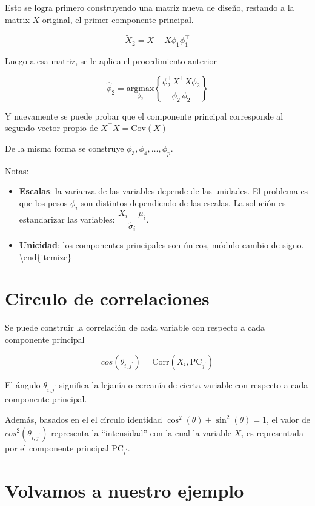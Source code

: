 \documentclass[
  12pt,
]{book}
\providecommand{\tightlist}{%
  \setlength{\itemsep}{0pt}\setlength{\parskip}{0pt}}
\theoremstyle{definition}
\theoremstyle{definition}
\theoremstyle{definition}
\theoremstyle{remark}
\begin{document}
Esto se logra primero construyendo una matriz nueva de diseño, restando a la matrix \(X\) original, el primer componente principal.

\[
\tilde{X}_2 = X - X\phi_1\phi_1^\top
\]

Luego a esa matriz, se le aplica el procedimiento anterior

\[
\hat{\phi}_2 = \underset{\phi_2}{\mathrm{argmax}} \left\{\frac{\phi_2^\top X^\top X \phi_2 }{\phi_2^\top \phi_2}\right\}
\]

Y nuevamente se puede probar que el componente principal corresponde al segundo vector propio de
\(X^\top X = \mathrm{Cov}(X)\)

De la misma forma se construye \(\phi_3,\phi_4,\dots, \phi_p\).

Notas:

\begin{itemize}
\tightlist
\item
  \textbf{Escalas}: la varianza de las variables depende de las unidades. El problema es que los pesos \(\phi_i\) son distintos dependiendo de las escalas. La solución es estandarizar las variables: \(\dfrac{X_i-\mu_i}{\hat\sigma_i}\).
\item
  \textbf{Unicidad}: los componentes principales son únicos, módulo cambio de signo.
  \textbackslash end\{itemize\}
\end{itemize}

\hypertarget{circulo-de-correlaciones}{%
\section{Circulo de correlaciones}\label{circulo-de-correlaciones}}

Se puede construir la correlación de cada variable con respecto a cada componente principal

\[
cos(\theta_{i,j^\prime}) = \mathrm{Corr}(X_i, \mathrm{PC}_{j^\prime})
\]

El ángulo \(\theta_{i,j^\prime}\) significa la lejanía o cercanía de cierta variable con respecto a cada componente principal.

Además, basados en el el círculo identidad \(\cos^2(\theta)+\sin^2(\theta)=1\), el valor de \(cos^2(\theta_{i,j^\prime})\) representa la \enquote{intensidad} con la cual la variable \(X_i\) es representada por el componente principal \(\mathrm{PC}_{i^\prime}\).

\hypertarget{volvamos-a-nuestro-ejemplo}{%
\section{Volvamos a nuestro ejemplo}\label{volvamos-a-nuestro-ejemplo}}
\end{document}

